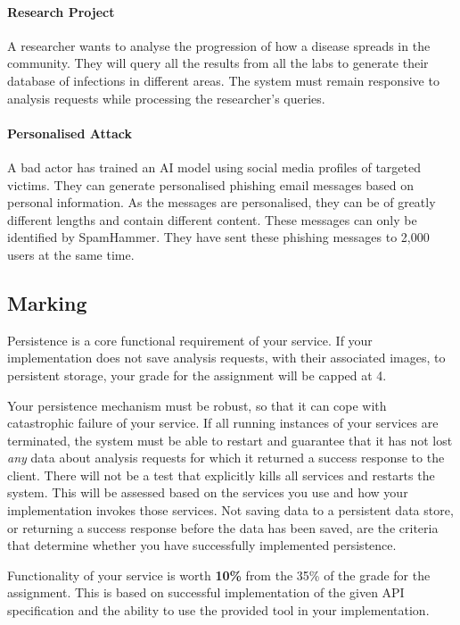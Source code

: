 \documentclass{csse4400}
\begin{document}
\paragraph{Research Project}
A researcher wants to analyse the progression of how a disease spreads in the community.
They will query all the results from all the labs to generate their database of infections in different areas.
The system must remain responsive to analysis requests while processing the researcher's queries.

\paragraph{Personalised Attack}
A bad actor has trained an AI model using social media profiles of targeted victims.
They can generate personalised phishing email messages based on personal information.
As the messages are personalised, they can be of greatly different lengths and contain different content.
These messages can only be identified by SpamHammer.
They have sent these phishing messages to 2,000 users at the same time.

\subsection{Marking}
Persistence is a core functional requirement of your service.
If your implementation does not save analysis requests, with their associated images,
to persistent storage, your grade for the assignment will be capped at 4.

Your persistence mechanism must be robust, so that it can cope with catastrophic failure of your service.
If all running instances of your services are terminated,
the system must be able to restart and guarantee that it has not lost \textit{any} data
about analysis requests for which it returned a success response to the client.
There will not be a test that explicitly kills all services and restarts the system.
This will be assessed based on the services you use and how your implementation invokes those services.
Not saving data to a persistent data store, or returning a success response before the data has been saved,
are the criteria that determine whether you have successfully implemented persistence.

Functionality of your service is worth \textbf{10\%} from the 35\% of the grade for the assignment.
This is based on successful implementation of the given API specification
and the ability to use the provided tool in your implementation.
\end{document}
